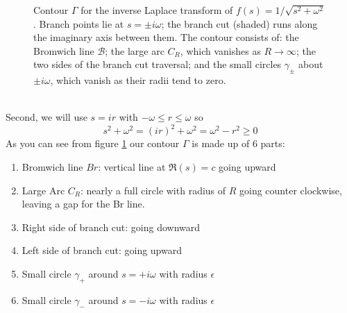 \begin{figure}[ht]
\caption{Contour $\Gamma$ for the inverse Laplace transform of
$f(s)=1/\!\sqrt{s^2+\omega^2}$.
Branch points lie at $s=\pm i\omega$; the branch cut (shaded)
runs along the imaginary axis between them.
The contour consists of: the Bromwich line $\mathcal{B}$;
the large arc $C_R$, which vanishes as $R\to\infty$;
the two sides of the branch cut traversal; and the small
circles $\gamma_{\pm}$ about $\pm i\omega$,
which vanish as their radii tend to zero.}
\label{fig:branch2}
\end{figure}
\\
Second, we will use $s=ir$ with $-\omega\leq r\leq\omega$ so $$s^2+\omega^2=(ir)^2+\omega^2=\omega^2-r^2\geq0$$ As you can see from figure \ref{fig:branch2} our contour $\Gamma$ is made up of 6 parts: \begin{enumerate}
    \item Bromwich line $Br$: vertical line at $\Re(s)=c$ going upward
    \item Large Arc $C_{R}$: nearly a full circle with radius of $R$ going counter clockwise, leaving a gap for the Br line. 
    \item Right side of branch cut: going downward
    \item Left side of branch cut: going upward
    \item Small circle $\gamma_{+}$ around $s=+i\omega$ with radius $\epsilon$
    \item Small circle $\gamma_{-}$ around $s=-i\omega$ with radius $\epsilon$
\end{enumerate}
